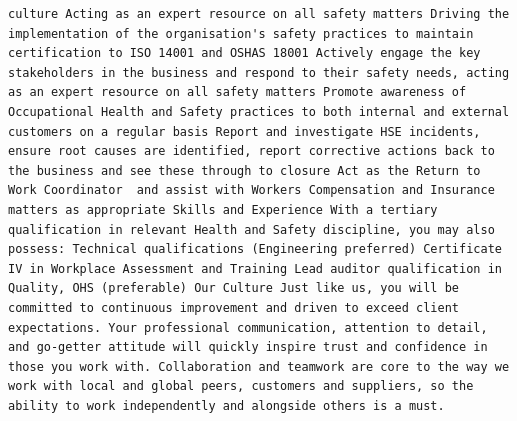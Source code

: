 \documentclass[11pt,a4paper,]{article}
\begin{document}
\begin{verbatim}
culture Acting as an expert resource on all safety matters Driving the implementation of the organisation's safety practices to maintain certification to ISO 14001 and OSHAS 18001 Actively engage the key stakeholders in the business and respond to their safety needs, acting as an expert resource on all safety matters Promote awareness of Occupational Health and Safety practices to both internal and external customers on a regular basis Report and investigate HSE incidents, ensure root causes are identified, report corrective actions back to the business and see these through to closure Act as the Return to Work Coordinator  and assist with Workers Compensation and Insurance matters as appropriate Skills and Experience With a tertiary qualification in relevant Health and Safety discipline, you may also possess: Technical qualifications (Engineering preferred) Certificate IV in Workplace Assessment and Training Lead auditor qualification in Quality, OHS (preferable) Our Culture Just like us, you will be committed to continuous improvement and driven to exceed client expectations. Your professional communication, attention to detail, and go-getter attitude will quickly inspire trust and confidence in those you work with. Collaboration and teamwork are core to the way we work with local and global peers, customers and suppliers, so the ability to work independently and alongside others is a must.

\end{verbatim}
\end{document}
